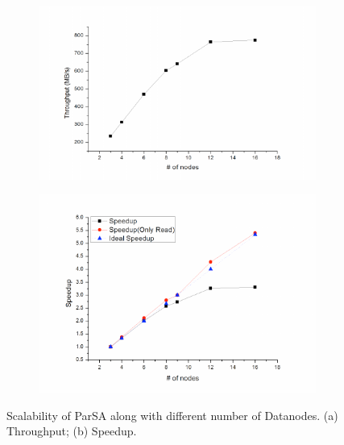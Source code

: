 \documentclass[preprint,12pt]{elsarticle}
\begin{document}
\begin{figure}[tbh]
    \centering
    \begin{subfigure}{0.5\textwidth}
        \includegraphics[width=\textwidth]{figure9a}
        \caption{}
        \label{figure9a}
    \end{subfigure}\begin{subfigure}{0.5\textwidth}
        \centering
        \includegraphics[width=\textwidth]{figure9b}%
        \caption{}
        \label{figure9b}
    \end{subfigure}
    \caption{Scalability of ParSA along with different number of Datanodes. (a) Throughput; (b) Speedup.}
    \label{figure9}
\end{figure}
\end{document}
